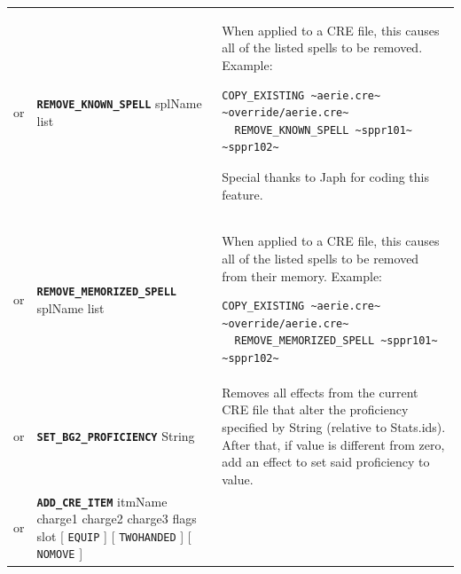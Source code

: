 \documentclass{article}
\def\ttref#1{\ahrefloc{#1}{\tt #1}}
\def\DEFINE#1{{\tt \bf #1}\label{#1}\index{#1}}
\def\t#1{{\tt #1}}
\def\Slist{{\color{red} list }}
\def\Ob{{\color{red} [ }}
\def\Oe{{\color{red} ] }}
\begin{document}
\begin{tabular}{cp{10in}|p{10in}}
or & \DEFINE{REMOVE_KNOWN_SPELL} splName \Slist &
  When applied to a CRE file, this \ttref{patch} causes all of the
  listed spells to be removed. Example:
\begin{verbatim}
COPY_EXISTING ~aerie.cre~ ~override/aerie.cre~
  REMOVE_KNOWN_SPELL ~sppr101~ ~sppr102~
\end{verbatim}
  Special thanks to Japh for coding this feature.  \\

or & \DEFINE{REMOVE_MEMORIZED_SPELL} splName \Slist &
  When applied to a CRE file, this \ttref{patch} causes all of the
  listed spells to be removed from their memory. Example:
\begin{verbatim}
COPY_EXISTING ~aerie.cre~ ~override/aerie.cre~
  REMOVE_MEMORIZED_SPELL ~sppr101~ ~sppr102~
\end{verbatim}
 \\

or & \DEFINE{SET_BG2_PROFICIENCY} String \ttref{value} &
	Removes all effects from the current CRE file that alter the proficiency specified by
	String (relative to Stats.ids). After that, if value is different from zero, add an effect
	to set said proficiency to value. \\

or & \DEFINE{ADD_CRE_ITEM} itmName charge1 charge2 charge3 flags slot \Ob
\t{EQUIP} \Oe \Ob \t{TWOHANDED} \Oe \Ob \t{NOMOVE} \Oe &


\end{tabular}
\end{document}
